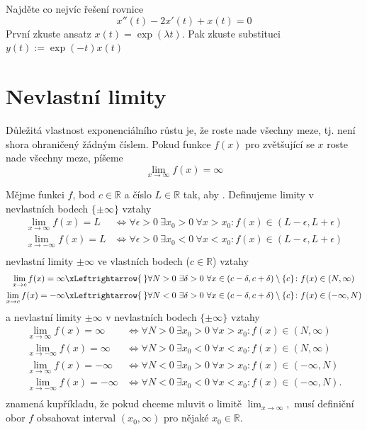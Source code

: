 \begin{úloha}
  Najděte co nejvíc řešení rovnice
\begin{equation*}
  x''(t)-2x'(t)+x(t)=0
\end{equation*}
První zkuste ansatz $x(t)=\exp(\lambda t).$ Pak zkuste substituci $y(t):= \exp(-t)x(t)$
\end{úloha}

\section{Nevlastní limity}
Důležitá vlastnost exponenciálního růstu je, že roste nade všechny meze, tj. není shora ohraničený žádným číslem. Pokud funkce $f(x)$ pro zvětšující se $x$ roste nade všechny meze, píšeme
\begin{equation*}
	\lim_{x\to \infty}f(x)=\infty
\end{equation*}
\begin{definice} Mějme funkci $f$, bod $c\in \mathbb{R}$ a číslo $L\in \mathbb{R}$ tak, aby . Definujeme limity v nevlastních bodech $\{\pm \infty\}$ vztahy
  \begin{align*}
	  \lim_{x\to \infty}f(x)=L &\iff \forall \epsilon>0\ \exists x_0>0\ \forall x>x_0\colon f(x)\in (L-\epsilon, L+\epsilon) \\
	  \lim_{x\to -\infty}f(x)=L &\iff \forall \epsilon>0\ \exists x_0<0\ \forall x<x_0\colon f(x)\in (L-\epsilon, L+\epsilon) \\
\end{align*}
nevlastní limity ${\pm \infty}$ ve vlastních bodech ($c\in \mathbb{R}$) vztahy
\newcommand{\ifff}{\xLeftrightarrow{\hspace{.2em}}}
\begin{align*}
	  \lim_{x\to c}f(x)=\infty &\ifff \forall N>0\ \exists \delta>0\ \forall x\in(c-\delta,c+\delta)\setminus \{c\}\colon f(x)\in(N,\infty) \\
	  \lim_{x\to c}f(x)=-\infty &\ifff \forall N<0\ \exists \delta>0\ \forall x\in(c-\delta,c+\delta)\setminus \{c\}\colon f(x)\in(-\infty,N) \\
  \end{align*}
  a nevlastní limity ${\pm \infty}$ v nevlastních bodech $\{\pm \infty\}$ vztahy
\begin{align*}
	  \lim_{x\to \infty}f(x)=\infty &\iff \forall N>0\ \exists x_0>0\ \forall x>x_0\colon f(x)\in(N,\infty) \\
	  \lim_{x\to -\infty}f(x)=\infty &\iff \forall N>0\ \exists x_0<0\ \forall x<x_0\colon f(x)\in(N,\infty) \\
	  \lim_{x\to \infty}f(x)=-\infty &\iff \forall N<0\ \exists x_0>0\ \forall x>x_0\colon f(x)\in(-\infty,N) \\
	  \lim_{x\to -\infty}f(x)=-\infty &\iff \forall N<0\ \exists x_0<0\ \forall x<x_0\colon f(x)\in(-\infty,N). \\
  \end{align*}
   znamená kupříkladu, že pokud chceme mluvit o limitě $\lim_{x\to \infty},$ musí definiční obor $f$ obsahovat interval $(x_0,\infty)$ pro nějaké $x_0\in \mathbb{R}.$
\end{definice}


